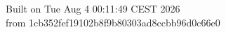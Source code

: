 {\noindent Built on Tue Aug  4 00:11:49 CEST 2026} \\ 
 {\noindent from 1cb352fef19102b8f9b80303ad8ccbb96d0c66e0}
